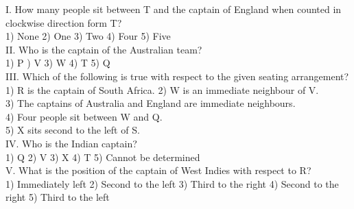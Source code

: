 \documentclass[
]{article}
\begin{document}
I. How many people sit between T and the captain of England when counted in clockwise
direction form T?\\
1) None \hspace{2mm}2) One \hspace{2mm}3) Two \hspace{2mm}4) Four \hspace{2mm}5) Five\\

II. Who is the captain of the Australian team?\\
1) P \hspace{2mm}) V \hspace{2mm}3) W \hspace{2mm}4) T \hspace{2mm}5) Q\\

III. Which of the following is true with respect to the given seating arrangement?\\
1) R is the captain of South Africa. 2) W is an immediate neighbour of V.\\
3) The captains of Australia and England are immediate neighbours.\\
4) Four people sit between W and Q.\\
5) X sits second to the left of S.\\

IV. Who is the Indian captain?\\
1) Q \hspace{2mm}2) V \hspace{2mm}3) X \hspace{2mm}4) T \hspace{2mm}5) Cannot be determined\\

V. What is the position of the captain of West Indies with respect to R?\\
1) Immediately left \hspace{2mm}2) Second to the left \hspace{2mm}3) Third to the right
\hspace{2mm}4) Second to the right \hspace{2mm}5) Third to the left\\
\end{document}
